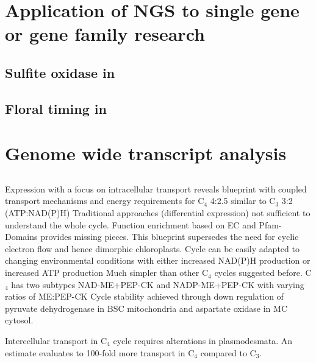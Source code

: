 	
		
	
 \section{Application of NGS to single gene or gene family research}
 \subsection{Sulfite oxidase in }
 \subsection{Floral timing in }
 
 \section{Genome wide transcript analysis}
 \subsection{}
 Expression with a focus on intracellular transport reveals blueprint with coupled transport mechanisms and energy requirements for C$_4$ 4:2.5 similar to C$_3$ 3:2 (ATP:NAD(P)H)
 Traditional approaches (differential expression) not sufficient to understand the whole cycle.
 Function enrichment based on EC and Pfam-Domains provides missing pieces.
 This blueprint supersedes the need for cyclic electron flow and hence dimorphic chloroplasts.
 Cycle can be easily adapted to changing environmental conditions with either increased NAD(P)H production or increased ATP production
 Much simpler than other C$_4$ cycles suggested before.
 C$_4$ has two subtypes NAD-ME+PEP-CK and NADP-ME+PEP-CK with varying ratios of ME:PEP-CK
 Cycle stability achieved through down regulation of pyruvate dehydrogenase in BSC mitochondria and aspartate oxidase in MC cytosol.
 
 Intercellular transport in C$_4$ cycle requires alterations in plasmodesmata.
 An estimate evaluates to 100-fold more transport in C$_4$ compared to C$_3$.
 

